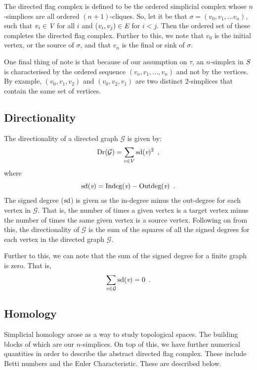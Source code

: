 The directed flag complex is defined to be the ordered simplicial complex whose $n$-simplices are all ordered $(n+1)$-cliques. So, let it be that $\sigma = (v_0, v_1, ...v_n)$, such that $v_i \in \emph{V}$ for all $i$ and ($v_i, v_j) \in \emph{E}$ for $i < j$. Then the ordered set of these completes the directed flag complex. Further to this, we note that $v_0$ is the initial vertex, or the source of $\sigma$, and that $v_n$ is the final or sink of $\sigma$.

One final thing of note is that because of our assumption on $\tau$, an $n$-simplex in $\emph{S}$ is characterised by the ordered sequence $(v_o, v_1, ..., v_n)$ and not by the vertices. By example, $(v_0, v_1, v_2)$ and $(v_0, v_2, v_1)$ are two distinct 2-simplices that contain the same set of vertices.

\subsection{Directionality}
The directionality \cite{Reimann_2017} of a directed graph $\mathcal{G}$ is given by:
\begin{equation}
    \text{Dr}(\mathcal{G}) = \sum_{v \in V} \text{sd}(\emph{v})^2 \enspace{,}
\end{equation}
where
\begin{equation}
    \text{sd}(\emph{v}) = \text{Indeg}(\emph{v}) - \text{Outdeg}(\emph{v})\enspace{.}
\end{equation}
The signed degree ($\text{sd}$) is given as the in-degree minus the out-degree for each vertex in $\mathcal{G}$. That is, the number of times a given vertex is a target vertex minus the number of times the same given vertex is a source vertex. Following on from this, the directionality of $\mathcal{G}$ is the sum of the squares of all the signed degrees for each vertex in the directed graph $\mathcal{G}$.

Further to this, we can note that the sum of the signed degree for a finite graph is zero. That is,
\begin{equation}
    \sum_{v \in \mathcal{G}}\text{sd}(\emph{v}) = 0 \enspace{.}
\end{equation}

\subsection{Homology}
Simplicial homology arose as a way to study topological spaces. The building blocks of which are our $n$-simplices. On top of this, we have further numerical quantities in order to describe the abstract directed flag complex. These include Betti numbers and the Euler Characteristic. These are described below.

